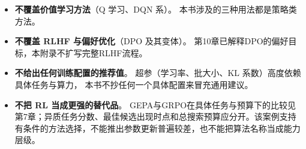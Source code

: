 \begin{itemize}
  \item \textbf{不覆盖价值学习方法}（Q 学习、DQN 系）。
        本书涉及的三种用法都是策略类方法。
  \item \textbf{不覆盖 RLHF 与偏好优化}（DPO 及其变体）。
        第10章已解释DPO的偏好目标，本附录不扩写完整RLHF流程。
  \item \textbf{不给出任何训练配置的推荐值}。
        超参（学习率、批大小、KL 系数）高度依赖具体任务与算力，
        本书不抄任何一个具体配置来冒充通用建议。
  \item \textbf{不把 RL 当成更强的替代品}。
        GEPA与GRPO在具体任务与预算下的比较见第7章；异质任务分数、最佳候选出现时点和总搜索预算应分开。该案例支持有条件的方法选择，不能推出参数更新普遍较差，也不能把算法名称当成能力层级。
\end{itemize}

